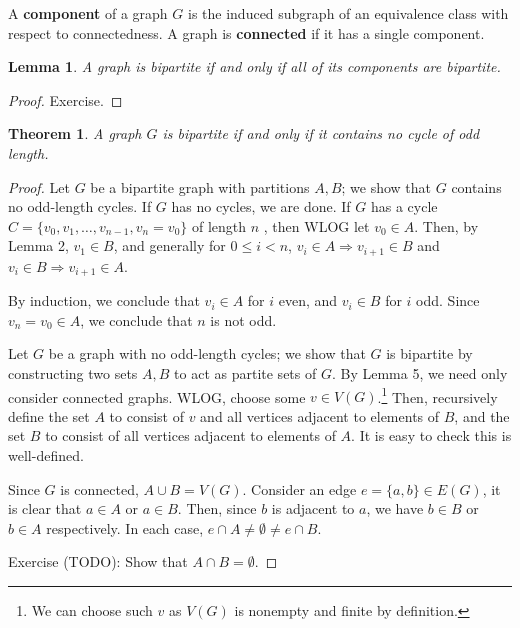 \documentclass[a4paper,12pt]{article}
\newtheorem{theorem}{Theorem}
\newtheorem{lemma}{Lemma}
\begin{document}
A {\bf component} of a graph $G$ is the induced subgraph of an equivalence class
with respect to connectedness. A graph is {\bf connected} if it has a single
component.

\begin{lemma}
A graph is bipartite if and only if all of its components are bipartite.
\end{lemma}

\begin{proof} Exercise. \end{proof} %

\begin{theorem}
A graph $G$ is bipartite if and only if it contains no cycle of odd length.
\end{theorem}

\begin{proof}
Let $G$ be a bipartite graph with partitions $A, B$;
we show that $G$ contains no odd-length cycles.
If $G$ has no cycles, we are done. If $G$ has a cycle
$C = \{v_0, v_1, \dots, v_{n-1}, v_n=v_0\}$ of length $n$
, then WLOG let $v_0 \in A$. Then,
by Lemma 2, $v_1 \in B$, and generally for $0 \leq i < n$,
$v_{i} \in A \Rightarrow v_{i+1} \in B$ and
$v_{i} \in B \Rightarrow v_{i+1} \in A$.

By induction, we conclude that $v_i \in A$ for $i$ even, and $v_i \in B$ for
$i$ odd. Since $v_n = v_0 \in A$, we conclude that $n$ is not odd.

Let $G$ be a graph with no odd-length cycles; we show that $G$ is bipartite
by constructing two sets $A, B$ to act as partite sets of $G$.
By Lemma 5, we need only consider connected graphs.
WLOG, choose some $v \in V(G)$.\footnote{We can choose such
$v$ as $V(G)$ is nonempty and finite by definition.} Then, recursively define
the set $A$ to consist of $v$ and all vertices adjacent to elements of $B$, and
the set $B$ to consist of all vertices adjacent to elements of $A$. It is easy
to check this is well-defined.

Since $G$ is connected, $A \cup B = V(G)$. Consider an edge
$e = \{a, b\} \in E(G)$, it is clear that $a \in A$ or $a \in B$. Then, since
$b$ is adjacent to $a$, we have $b \in B$ or $b \in A$ respectively.
In each case, $e \cap A \neq \emptyset \neq e \cap B$.

Exercise (TODO): Show that $A \cap B = \emptyset$.
\end{proof}
\end{document}
